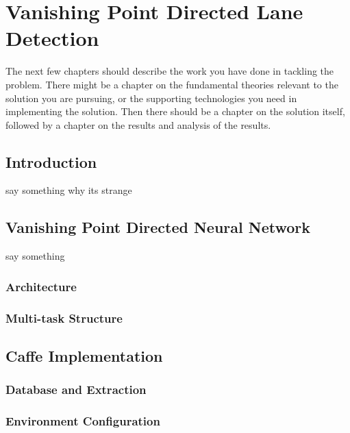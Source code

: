
\chapter{Vanishing Point Directed Lane Detection}
\label{cha:model}
\begin{spacing}{1.5}
\setlength{\parskip}{0.3in}

The next few chapters should describe the work you have done in tackling the problem. There might be a chapter on the fundamental theories relevant to the solution you are pursuing, or the supporting technologies you need in implementing the solution. Then there should be a chapter on the solution itself, followed by a chapter on the results and analysis of the results.

\section{Introduction}

say something why its strange

\section{Vanishing Point Directed Neural Network}
\label{sec:MD_model}

say something

\subsection{Architecture}

\subsection{Multi-task Structure}


\section{Caffe Implementation}
\label{sec:MD_CAFFE}

\subsection{Database and Extraction}

\subsection{Environment Configuration}


\end{spacing}
